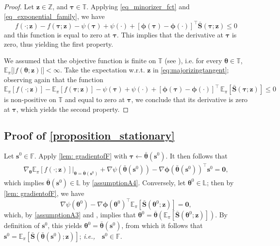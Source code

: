\documentclass{article}
\def\ie{{\em i.e.,~}}
\newcommand{\zero}{\ensuremath{\mathbf{0}}}
\newcommand{\nn}{\nonumber} %
\def\phib        {{\sbmm{\phi}}\XS}        \def\Phib       {{\sbmm{\Phi}}\XS}
\def\XS{\xspace}
\def\sbmm#1{\ensuremath{\boldsymbol{#1}}}
\def\PE{\mathbb{E}_\pi} %
\def\param{\vtheta}
\def\barparam{\bar{\param}}
\def\bars{\bar{\vS}}
\def\rvz{{\mathbf{z}}}
\def\vtau{{\bm{\tau}}}
\def\vtheta{{\bm{\theta}}}
\def\vs{{\bm{s}}}
\def\vS{{\bm{S}}}
\def\sF{{\mathbb{F}}}
\def\sL{{\mathbb{L}}}
\def\sT{{\mathbb{T}}}
\def\sZ{{\mathbb{Z}}}
\begin{document}
\begin{proof}
Let $\rvz \in \sZ$, and $\vtau\in \sT$. Applying \cref{eq_minorizer_fct} and \cref{eq_exponential_family}, we have
\begin{equation} \label{eq:majorizingtangent}
    f(\cdot; \rvz) - f(\vtau; \rvz)  
        - \psi\left(\vtau\right) + \psi\left(\cdot\right) + \left[ \phib(\vtau)-\phib(\cdot)\right]^\top\bars(\vtau;\rvz)  \leq 0
\end{equation}  
and this function is equal to zero at $\vtau$. This implies that the derivative at $\vtau$ is zero, thus yielding the first property. 

We assumed that the objective function is finite on $\sT$ (see ), i.e.
for every $\vtheta \in \sT$, $\PE\big[|f(\vtheta;\rvz)|\big] < \infty$.  
Take the expectation w.r.t. $\rvz$ in \cref{eq:majorizingtangent}; observing again that the function
\begin{equation*} 
    \PE\left[ f(\cdot; \rvz) \right]-  \PE\left[f(\vtau; \rvz) \right] 
        - \psi\left(\vtau\right) + \psi\left(\cdot\right) + \left[ \phib(\vtau)-\phib(\cdot)\right]^\top \,  \PE\left[\bars(\vtau;\rvz) \right] \leq 0
\end{equation*} 
is non-positive on 
$\sT$ and equal to zero at $\vtau$, we conclude that its derivative is zero at $\vtau$, which yields the second property. 
\end{proof}

\subsection{Proof of \texorpdfstring{\cref{proposition_stationary}}{Proposition \ref*{proposition_stationary}}}\label{proof_proposition_stationary}
Let $\vs^0 \in \sF$. Apply \cref{lem: gradientofF} with $\vtau \leftarrow \barparam(\vs^0)$. It then follows that 
\begin{align}
\nabla_\vtheta \PE\left[f(\cdot;\rvz)\right] \vert_{\vtheta = \barparam(\vs^0)}
  + \nabla \psi(\barparam(\vs^0))
  - \nabla \phib(\barparam(\vs^0))^\top \vs^{0} = \zero,\nn
\end{align}
which implies $\barparam(\vs^0) \in \sL$ by \cref{assumptionA4}. Conversely, let $\vtheta^{0} \in \sL$;  then by \cref{lem: gradientofF}, we have 
\[
\nabla \psi(\vtheta^{0}) - \nabla \phib(\vtheta^{0})^\top \PE\left[\bars(\vtheta^{0};\rvz) \right] = \zero,
\]
which, by \cref{assumptionA3} and , implies that
$\vtheta^{0} = \barparam\left(\PE\left[\bars(\vtheta^{0};\rvz) \right]\right)$.
By definition of $\vs^0$, this yields $\vtheta^{0} = \barparam(\vs^0)$, from which it follows that $\vs^0  =\PE\left[ \bars\left(\barparam(\vs^0);\rvz\right)\right]$; \ie\ $\vs^0 \in \sF$.
\end{document}
